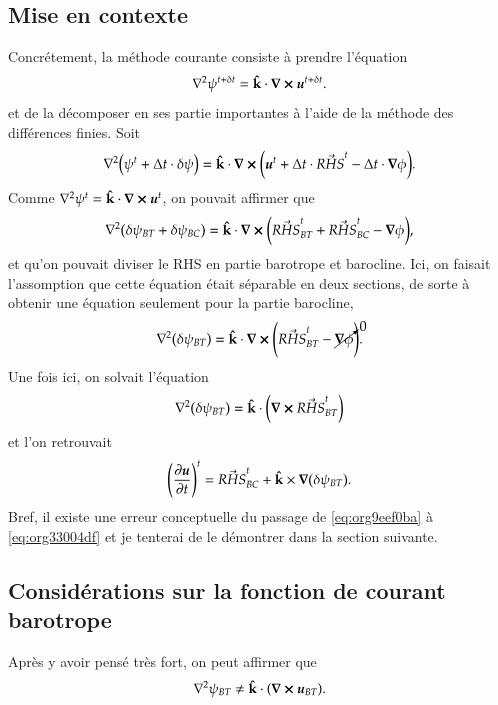\documentclass[10pt]{article}
\numberwithin{equation}{section}
\newcommand{\kvf}{\vb{\hat{k}}}
\newcommand{\uu}{\vb*{u}}
\begin{document}
\subsection{Mise en contexte}
\label{sec:orga5d4d4d}
Concrétement, la méthode courante consiste à prendre l'équation
\begin{equation}
   \laplacian{\psi^{t+\delta t}} = \kvf\cdot\curl{\uu^{t+\delta t}}.
\end{equation}
et de la décomposer en ses partie importantes à l'aide de la méthode des différences finies.
Soit
\begin{equation}
   \laplacian(\psi^t + \Delta t\cdot\delta \psi) = \kvf\cdot\curl(\uu^t + \Delta t\cdot\vec{RHS}^t - \Delta t\cdot\gradient{\phi}).
\end{equation}
Comme \(\laplacian{\psi^t} = \kvf\cdot\curl{\uu^t}\), on pouvait affirmer que
\begin{equation}
\label{eq:org9eef0ba}
   \laplacian(\delta \psi_{BT} + \delta \psi_{BC}) = \kvf\cdot\curl(\vec{RHS}^t_{BT} + \vec{RHS}^t_{BC} - \gradient{\phi}),
\end{equation}
et qu'on pouvait diviser le RHS en partie barotrope et barocline.
Ici, on faisait l'assomption que cette équation était séparable en deux sections, de sorte à obtenir une équation seulement pour la partie barocline,
\begin{equation}
\label{eq:org33004df}
   \laplacian(\delta \psi_{BT}) = \kvf\cdot\curl(\vec{RHS}^t_{BT} - \cancelto{0}{\gradient{\phi}}).
\end{equation}
Une fois ici, on solvait l'équation
\begin{equation}
   \laplacian(\delta \psi_{BT}) = \kvf\cdot\qty(\curl{\vec{RHS}^t_{BT}})
\end{equation}
et l'on retrouvait
\begin{equation}
   \qty(\pdv{\uu}{t})^t = \vec{RHS}^t_{BC} + \kvf\times\gradient(\delta\psi_{BT}).
\end{equation}
Bref, il existe une erreur conceptuelle du passage de \ref{eq:org9eef0ba} à \ref{eq:org33004df} et je tenterai de le démontrer dans la section suivante.


\subsection{Considérations sur la fonction de courant barotrope}
\label{sec:orgce23ecf}
Après y avoir pensé très fort, on peut affirmer que
\begin{equation}
   \laplacian{\psi_{BT}} \not= \kvf\cdot\qty(\curl{\uu_{BT}}).
\end{equation}
\end{document}
